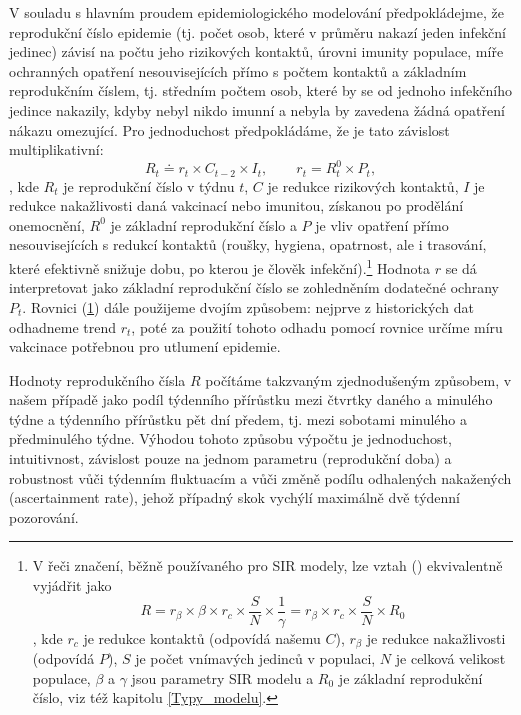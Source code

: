 V souladu s hlavním proudem epidemiologického modelování předpokládejme, že reprodukční číslo epidemie (tj. 
počet osob, které v průměru nakazí jeden infekční jedinec) závisí na počtu jeho
rizikových kontaktů, úrovni imunity populace, míře ochranných opatření
nesouvisejících přímo s počtem kontaktů a základním reprodukčním
číslem, tj. středním počtem osob, které by se od jednoho infekčního jedince nakazily, kdyby nebyl
nikdo imunní a nebyla by zavedena žádná opatření nákazu omezující. Pro jednoduchost
předpokládáme, že je tato závislost multiplikativní: 
\begin{equation}
R_{t}\doteq r_{t}\times C_{t-2}\times I_{t},\qquad r_{t}=R_{t}^{0}\times P_{t},
\label{eq:r}
\end{equation}
, kde $R_{t}$ je reprodukční číslo v týdnu $t$, $C$ je redukce rizikových kontaktů,
$I$ je redukce nakažlivosti daná vakcinací nebo imunitou, získanou
po prodělání onemocnění, $R^{0}$ je základní reprodukční číslo a
$P$ je vliv opatření přímo nesouvisejících s redukcí kontaktů (roušky, hygiena, opatrnost, ale i trasování, které efektivně snižuje dobu, po kterou je člověk infekční).\footnote{V řeči značení, běžně používaného pro SIR modely, lze vztah (\label{eq:r}) ekvivalentně vyjádřit jako 
$$ 
R = r_\beta \times \beta \times r_c \times \frac{S}{N} \times \frac{1}\gamma = r_\beta \times r_c \times \frac{S}{N} \times R_0
$$
, kde $r_c$ je redukce kontaktů (odpovídá našemu $C$), $r_\beta$ je redukce nakažlivosti (odpovídá $P$), $S$ je počet vnímavých jedinců v populaci, $N$ je celková velikost populace, $\beta$ a $\gamma$ jsou parametry SIR modelu a $R_0$ je základní reprodukční číslo, viz též kapitolu \ref{Typy_modelu}.} Hodnota $r$ se dá interpretovat jako základní reprodukční
číslo se zohledněním dodatečné ochrany $P_{t}$. Rovnici (\ref{eq:r}) dále použijeme dvojím způsobem: nejprve z historických dat odhadneme trend $r_t$, poté za použití tohoto odhadu pomocí rovnice určíme míru vakcinace potřebnou pro utlumení epidemie.

Hodnoty reprodukčního čísla $R$ počítáme takzvaným zjednodušeným způsobem, v našem případě jako podíl týdenního přírůstku mezi čtvrtky daného a minulého týdne a týdenního přírůstku pět dní předem,
tj. mezi sobotami minulého a předminulého týdne. Výhodou tohoto způsobu výpočtu je jednoduchost, intuitivnost, závislost pouze na jednom parametru (reprodukční doba) a robustnost vůči týdenním fluktuacím a vůči změně podílu
odhalených nakažených (ascertainment rate), jehož případný skok vychýlí
maximálně dvě týdenní pozorování.

